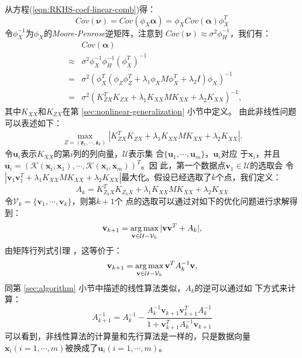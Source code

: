 从方程(\ref{eqn:RKHS-coef-linear-comb})得：
\begin{equation}\label{eqn:cov-nu-alpha}
Cov(\pmb{\nu})=Cov(\phi_X\pmb{\alpha})=\phi_X Cov(\pmb{\alpha})
\phi_X^T
\end{equation}
令$\phi_X^{-1}$为$\phi_X$的{\em Moore-Penrose}逆矩阵，注意到
$Cov(\pmb{\nu})\approx\sigma^2\phi_H^{-1}$，我们有：
\begin{eqnarray}
\label{eqn:cov-alpah}
&&Cov(\pmb{\alpha}) \nonumber \\
&\approx& \sigma^2 \phi_X^{-1} \phi_H^{-1} (\phi_X^T)^{-1} \nonumber \\
&=& \sigma^2 \left( \phi_X^T \left( \phi_Z\phi_Z^T +\lambda_1 \phi_X
M \phi_X^T + \lambda_2 I
 \right) \phi_X \right)^{-1} \nonumber \\
&=&\sigma^2 \left( K_{ZX}^T K_{ZX} + \lambda_1 K_{XX}MK_{XX}+
\lambda_2 K_{XX} \right)^{-1},
\end{eqnarray}
其中$K_{XX}$和$K_{ZX}$在第 \ref{sec:nonlinear-generalization} 小节中定义。
由此非线性问题可以表述如下：
\begin{eqnarray*}
\label{eqn:LOD} \max_{Z=(\mathbf{z}_1, \cdots, \mathbf{z}_k)}|
K_{ZX}^T K_{ZX} + \lambda_1 K_{XX}MK_{XX}+ \lambda_2 K_{XX} |.
\end{eqnarray*}
令$\mathbf{u}_i$表示$K_{XX}$的第$i$列的列向量，$\mathcal{U}$表示集
合$\{\mathbf{u}_1, \cdots, \mathbf{u}_m\}$，$\mathbf{u}_i$对应
于$\mathbf{x}_i$，并且$\mathbf{u}_i = (\mathcal{K}(\mathbf{x}_i,
\mathbf{x}_1), \cdots, \mathcal{K}(\mathbf{x}_i, \mathbf{x}_m))^T$。因
此，第一个数据点$\mathbf{v}_1 \in \mathcal{U}$的选取会
令$|\textbf{v}_1\textbf{v}_1^T + \lambda_1 K_{XX}MK_{XX}+ \lambda_2
K_{XX}|$最大化。假设已经选取了$k$个点，我们定义：
\begin{equation}\label{eqn:kernel-hessian}
A_k = K_{Z_kX}^T K_{Z_kX} + \lambda_1 K_{XX}MK_{XX}+ \lambda_2
K_{XX}
\end{equation}
令$\mathcal{V}_k=\{\mathbf{v}_1, \cdots, \mathbf{v}_k\}$，则第$k+1$个
点的选取可以通过对如下的优化问题进行求解得到：
\begin{equation}
\label{eqn:kernel-argmin-u} \textbf{v}_{k+1}=\operatorname*{arg\,max}_{\textbf{v} \in
\mathcal{U}-\mathcal{V}_k} |\textbf{v}\textbf{v}^T + A_k|,
\end{equation}
由矩阵行列式引理 \cite{Matrix-algebra-statistician}，这等价于：
\begin{equation}
\label{eqn:kernel-argmin-u-final}
\textbf{v}_{k+1}=\operatorname*{arg\,max}_{\textbf{v} \in \mathcal{U}-\mathcal{V}_k}
\textbf{v}^T A_k^{-1} \textbf{v} ,
\end{equation}
同第 \ref{sec:algorithm} 小节中描述的线性算法类似，$A_k$的逆可以通过如
下方式来计算：
\begin{equation}\label{eqn:update-Mk}
A_{k+1}^{-1} = A_k^{-1} -
\frac{A_k^{-1}\textbf{v}_{k+1}\textbf{v}_{k+1}^T A_k^{-1}}
{1+\textbf{v}_{k+1}^T A_k^{-1} \textbf{v}_{k+1}}
\end{equation}
可以看到，非线性算法的计算量和先行算法是一样的，只是数据向量
$\mathbf{x}_i (i=1, \cdots, m)$被换成了$\mathbf{u}_i (i=1, \cdots, m)$。

